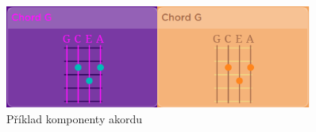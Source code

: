 \begin{figure}
    \centering
    \includegraphics[width=0.9\textwidth]{assets/g_chord.png}
    \caption{Příklad komponenty akordu}
    \label{fig:g_chord}
\end{figure}